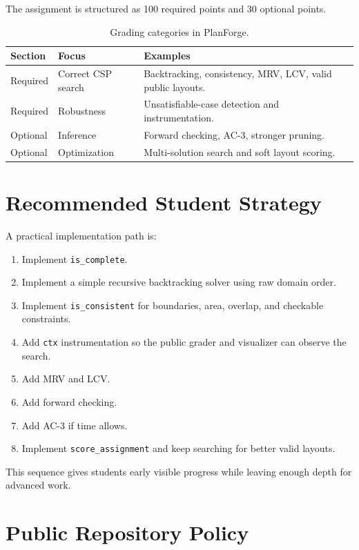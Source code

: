 \documentclass[11pt]{article}
\begin{document}
The assignment is structured as 100 required points and 30 optional points.

\begin{table}[H]
\centering
\begin{tabular}{lll}
\toprule
Section & Focus & Examples \\
\midrule
Required & Correct CSP search & Backtracking, consistency, MRV, LCV, valid public layouts. \\
Required & Robustness & Unsatisfiable-case detection and instrumentation. \\
Optional & Inference & Forward checking, AC-3, stronger pruning. \\
Optional & Optimization & Multi-solution search and soft layout scoring. \\
\bottomrule
\end{tabular}
\caption{Grading categories in PlanForge.}
\end{table}

\section{Recommended Student Strategy}

A practical implementation path is:

\begin{enumerate}[leftmargin=*]
  \item Implement \texttt{is\_complete}.
  \item Implement a simple recursive backtracking solver using raw domain order.
  \item Implement \texttt{is\_consistent} for boundaries, area, overlap, and checkable constraints.
  \item Add \texttt{ctx} instrumentation so the public grader and visualizer can observe the search.
  \item Add MRV and LCV.
  \item Add forward checking.
  \item Add AC-3 if time allows.
  \item Implement \texttt{score\_assignment} and keep searching for better valid layouts.
\end{enumerate}

This sequence gives students early visible progress while leaving enough depth for advanced work.

\section{Public Repository Policy}
\end{document}
